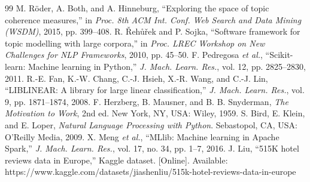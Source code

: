 \documentclass[11pt,journal,draftclsnofoot,onecolumn]{IEEEtran}
\begin{document}
\begin{thebibliography}{99}
 M. R\"oder, A. Both, and A. Hinneburg, ``Exploring the space of topic coherence measures,'' in \emph{Proc. 8th ACM Int. Conf. Web Search and Data Mining (WSDM)}, 2015, pp. 399--408.
 R. \v{R}eh\r{u}\v{r}ek and P. Sojka, ``Software framework for topic modelling with large corpora,'' in \emph{Proc. LREC Workshop on New Challenges for NLP Frameworks}, 2010, pp. 45--50.
 F. Pedregosa \emph{et al.}, ``Scikit-learn: Machine learning in Python,'' \emph{J. Mach. Learn. Res.}, vol. 12, pp. 2825--2830, 2011.
 R.-E. Fan, K.-W. Chang, C.-J. Hsieh, X.-R. Wang, and C.-J. Lin, ``LIBLINEAR: A library for large linear classification,'' \emph{J. Mach. Learn. Res.}, vol. 9, pp. 1871--1874, 2008.
 F. Herzberg, B. Mausner, and B. B. Snyderman, \emph{The Motivation to Work}, 2nd ed. New York, NY, USA: Wiley, 1959.
 S. Bird, E. Klein, and E. Loper, \emph{Natural Language Processing with Python}. Sebastopol, CA, USA: O'Reilly Media, 2009.
 X. Meng \emph{et al.}, ``MLlib: Machine learning in Apache Spark,'' \emph{J. Mach. Learn. Res.}, vol. 17, no. 34, pp. 1--7, 2016.
 J. Liu, ``515K hotel reviews data in Europe,'' Kaggle dataset. [Online]. Available: https://www.kaggle.com/datasets/jiashenliu/515k-hotel-reviews-data-in-europe
\end{thebibliography}
\end{document}
